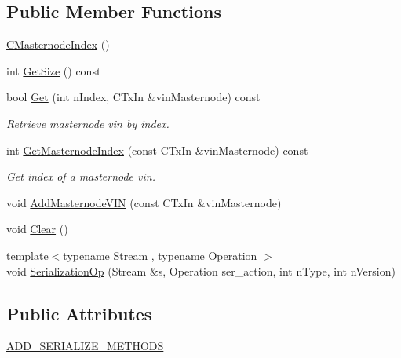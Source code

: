 \subsection*{Public Member Functions}
\begin{DoxyCompactItemize}
\item 
\mbox{\hyperlink{class_c_masternode_index_a5741b7c418d1d2b545399ce3d13ad65b}{C\+Masternode\+Index}} ()
\item 
int \mbox{\hyperlink{class_c_masternode_index_accf7ccda46096811469e216910f4608f}{Get\+Size}} () const
\item 
bool \mbox{\hyperlink{class_c_masternode_index_a85022155c9093fcb1ea5bb1deb7dd2b0}{Get}} (int n\+Index, C\+Tx\+In \&vin\+Masternode) const
\begin{DoxyCompactList}\small\item\em Retrieve masternode vin by index. \end{DoxyCompactList}\item 
int \mbox{\hyperlink{class_c_masternode_index_a87af53e12ba73eaeecb4d28bb98813d1}{Get\+Masternode\+Index}} (const C\+Tx\+In \&vin\+Masternode) const
\begin{DoxyCompactList}\small\item\em Get index of a masternode vin. \end{DoxyCompactList}\item 
void \mbox{\hyperlink{class_c_masternode_index_ad62fa26d65c04335b00463c29cd766f7}{Add\+Masternode\+V\+IN}} (const C\+Tx\+In \&vin\+Masternode)
\item 
void \mbox{\hyperlink{class_c_masternode_index_a6d191c879a7029e41be2f36a5e14af0a}{Clear}} ()
\item 
{\footnotesize template$<$typename Stream , typename Operation $>$ }\\void \mbox{\hyperlink{class_c_masternode_index_a11fe7d7c87902287b5a6fc5b46953628}{Serialization\+Op}} (Stream \&s, Operation ser\+\_\+action, int n\+Type, int n\+Version)
\end{DoxyCompactItemize}
\subsection*{Public Attributes}
\begin{DoxyCompactItemize}
\item 
\mbox{\hyperlink{class_c_masternode_index_a49d9d48a596c5f3a92cc812a09762930}{A\+D\+D\+\_\+\+S\+E\+R\+I\+A\+L\+I\+Z\+E\+\_\+\+M\+E\+T\+H\+O\+DS}}
\end{DoxyCompactItemize}
